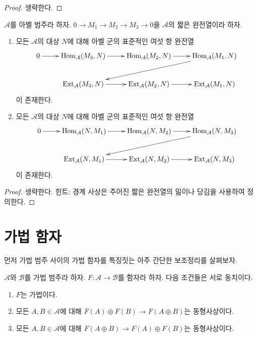 \begin{proof}
생략한다.
\end{proof}

\begin{lemma}
\label{lemma-six-term-sequence-ext}
$\mathcal{A}$를 아벨 범주라 하자.
$0 \to M_1 \to M_2 \to M_3 \to 0$을 $\mathcal{A}$의 짧은 완전열이라 하자.
\begin{enumerate}
\item 모든 $\mathcal{A}$의 대상 $N$에 대해 아벨 군의 표준적인 여섯 항
완전열
$$
\xymatrix{
0 \ar[r] &
\Hom_\mathcal{A}(M_3, N) \ar[r] &
\Hom_\mathcal{A}(M_2, N) \ar[r] &
\Hom_\mathcal{A}(M_1, N) \ar[lld] \\
& \Ext_\mathcal{A}(M_3, N) \ar[r] &
\Ext_\mathcal{A}(M_2, N) \ar[r] &
\Ext_\mathcal{A}(M_1, N)
}
$$
이 존재한다.
\item 모든 $\mathcal{A}$의 대상 $N$에 대해 아벨 군의 표준적인 여섯 항
완전열
$$
\xymatrix{
0 \ar[r] &
\Hom_\mathcal{A}(N, M_1) \ar[r] &
\Hom_\mathcal{A}(N, M_2) \ar[r] &
\Hom_\mathcal{A}(N, M_3) \ar[lld] \\
& \Ext_\mathcal{A}(N, M_1) \ar[r] &
\Ext_\mathcal{A}(N, M_2) \ar[r] &
\Ext_\mathcal{A}(N, M_3)
}
$$
이 존재한다.
\end{enumerate}
\end{lemma}

\begin{proof}
생략한다. 힌트: 경계 사상은 주어진 짧은 완전열의 밂이나 당김을 사용하여
정의한다.
\end{proof}






\section{가법 함자}
\label{section-functors}

\noindent
먼저 가법 범주 사이의 가법 함자를 특징짓는 아주 간단한 보조정리를
살펴보자.

\begin{lemma}
\label{lemma-additive-functor}
$\mathcal{A}$와 $\mathcal{B}$를 가법 범주라 하자.
$F : \mathcal{A} \to \mathcal{B}$를 함자라 하자.
다음 조건들은 서로 동치이다.
\begin{enumerate}
\item $F$는 가법이다.
\item 모든 $A, B \in \mathcal{A}$에 대해
$F(A) \oplus F(B) \to F(A \oplus B)$는 동형사상이다.
\item 모든 $A, B \in \mathcal{A}$에 대해
$F(A \oplus B) \to F(A) \oplus F(B)$는 동형사상이다.
\end{enumerate}
\end{lemma}

